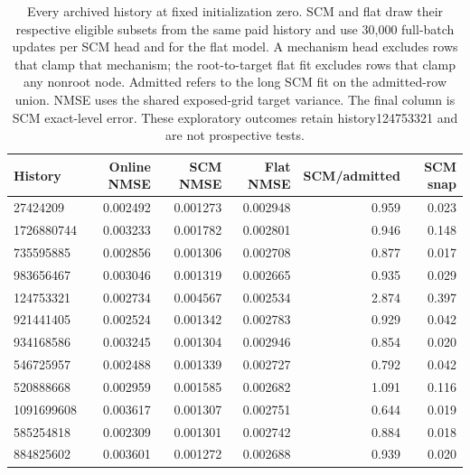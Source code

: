 \begin{table}[ht]
\centering\small
\begin{tabular}{lrrrrr}
\toprule
History & Online NMSE & SCM NMSE & Flat NMSE & SCM/admitted & SCM snap\\
\midrule
27424209 & 0.002492 & 0.001273 & 0.002948 & 0.959 & 0.023\\
1726880744 & 0.003233 & 0.001782 & 0.002801 & 0.946 & 0.148\\
735595885 & 0.002856 & 0.001306 & 0.002708 & 0.877 & 0.017\\
983656467 & 0.003046 & 0.001319 & 0.002665 & 0.935 & 0.029\\
124753321 & 0.002734 & 0.004567 & 0.002534 & 2.874 & 0.397\\
921441405 & 0.002524 & 0.001342 & 0.002783 & 0.929 & 0.042\\
934168586 & 0.003245 & 0.001304 & 0.002946 & 0.854 & 0.020\\
546725957 & 0.002488 & 0.001339 & 0.002727 & 0.792 & 0.042\\
520888668 & 0.002959 & 0.001585 & 0.002682 & 1.091 & 0.116\\
1091699608 & 0.003617 & 0.001307 & 0.002751 & 0.644 & 0.019\\
585254818 & 0.002309 & 0.001301 & 0.002742 & 0.884 & 0.018\\
884825602 & 0.003601 & 0.001272 & 0.002688 & 0.939 & 0.020\\
\bottomrule
\end{tabular}
\caption{Every archived history at fixed initialization zero. SCM and flat draw their respective eligible subsets from the same paid history and use 30,000 full-batch updates per SCM head and for the flat model. A mechanism head excludes rows that clamp that mechanism; the root-to-target flat fit excludes rows that clamp any nonroot node. Admitted refers to the long SCM fit on the admitted-row union. NMSE uses the shared exposed-grid target variance. The final column is SCM exact-level error. These exploratory outcomes retain history124753321 and are not prospective tests.}
\label{tab:attribution-histories}
\end{table}
